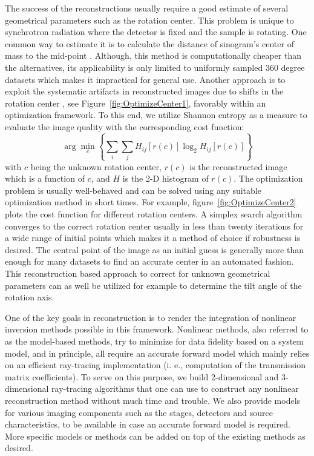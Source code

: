 \documentclass[pdf]{iucr}              %
\begin{document}
The success of the reconstructions usually require a good estimate of several geometrical parameters such as the rotation center. This problem is unique to synchrotron radiation where the detector is fixed and the sample is rotating. One common way to estimate it is to calculate the distance of sinogram's center of mass to the mid-point \cite{Azevedo}. Although, this method is computationally cheaper than the alternatives, its applicability is only limited to uniformly sampled 360 degree datasets which makes it impractical for general use. Another approach is to exploit the systematic artifacts in reconstructed images due to shifts in the rotation center \cite{donath_spie_2006}, see Figure~\ref{fig:OptimizeCenter1}, favorably within an optimization framework. To this end, we utilize Shannon entropy as a measure to evaluate the image quality with the corresponding cost function:
\begin{equation}
\arg \min_c \left\{\sum_i \sum_jH_{ij}\left[r(c)\right]\log_2 H_{ij}\left[r(c)\right]\right\}
\end{equation}
with $c$ being the unknown rotation center, $r(c)$ is the reconstructed image which is a function of $c$, and $H$ is the 2-D histogram of $r(c)$. The optimization problem is usually well-behaved and can be solved using any suitable optimization method in short times. For example, figure~\ref{fig:OptimizeCenter2} plots the cost function for different rotation centers. A simplex search algorithm converges to the correct rotation center usually in less than twenty iterations for a wide range of initial points which makes it a method of choice if robustness is desired. The central point of the image as an initial guess is generally more than enough for many datasets to find an accurate center in an automated fashion. This reconstruction based approach to correct for unknown geometrical parameters can as well be utilized for example to determine the tilt angle of the rotation axis.

One of the key goals in reconstruction is to render the integration of nonlinear inversion methods possible in this framework. Nonlinear methods, also referred to as the model-based methods, try to minimize for data fidelity based on a system model, and in principle, all require an accurate forward model which mainly relies on an efficient ray-tracing implementation (i. e., computation of the transmission matrix coefficients). To serve on this purpose, we build 2-dimensional and 3-dimensional ray-tracing algorithms that one can use to construct any nonlinear reconstruction method without much time and trouble. We also provide models for various imaging components such as the stages, detectors and source characteristics, to be available in case an accurate forward model is required. More specific models or methods can be added on top of the existing methods as desired.
\end{document}
